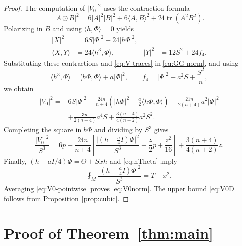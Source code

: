 \documentclass[11pt,reqno]{amsart}
\numberwithin{equation}{section}
\newcommand{\tr}{\operatorname{tr}}
\newcommand{\ip}[2]{\langle #1,#2\rangle}
\newcommand{\norm}[1]{\lvert #1\rvert}
\begin{document}
\begin{proof}
The computation of $\norm{V_0}^2$ uses the contraction formula
\[
\norm{A\odot B}^2
=6\norm A^2\norm B^2+6\ip AB^2+24\tr(A^2B^2).
\]
Polarizing in $B$ and using $\ip h\Phi=0$ yields
\[
\begin{aligned}
\norm X^2&=6S\norm\Phi^2+24\norm{h\Phi}^2,\\
\ip XY&=24\ip{h^3}{\Phi},
&\norm Y^2&=12S^2+24f_4.
\end{aligned}
\]
Substituting these contractions and \eqref{eq:V-traces} in \eqref{eq:GG-norm}, and using
\[
\ip{h^3}{\Phi}=\ip{h\Phi}{\Phi}+a\norm\Phi^2,
\qquad f_4=\norm\Phi^2+a^2S+\frac{S^2}{n},
\]
we obtain
\begin{align*}
\norm{V_0}^2
={}&6S\norm\Phi^2
+\frac{24n}{n+4}\left(\norm{h\Phi}^2-\frac a2\ip{h\Phi}{\Phi}\right)
-\frac{21n}{2(n+4)}a^2\norm\Phi^2\\
&+\frac{3n}{2(n+4)}a^4S
+\frac{3(n+4)}{4(n+2)}a^2S^2.
\end{align*}
Completing the square in $h\Phi$ and dividing by $S^3$ gives
\begin{equation}\label{eq:V0-pointwise}
\frac{\norm{V_0}^2}{S^3}
=6p+\frac{24n}{n+4}
\left[\frac{\norm{(h-\frac a4I)\Phi}^2}{S^3}
-\frac z2p+\frac{z^2}{16}\right]
+\frac{3(n+4)}{4(n+2)}z.
\end{equation}
Finally, $(h-aI/4)\Phi=\Theta+Sxh$ and \eqref{eq:hTheta} imply
\[
\fint_M\frac{\norm{(h-\frac a4I)\Phi}^2}{S^3}=T+x^2.
\]
Averaging \eqref{eq:V0-pointwise} proves \eqref{eq:V0norm}.
The upper bound \eqref{eq:V0D} follows from Proposition~\ref{prop:cubic}.
\end{proof}


\section{Proof of Theorem~\ref{thm:main}}\label{sec:completion}
\end{document}
